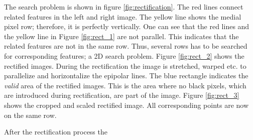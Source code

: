 \documentclass[11pt]{article}
\begin{document}
The search problem is shown in figure \ref{fig:rectification}. The red lines connect related features in the left and right image. The yellow line shows the medial pixel row; therefore, it is perfectly vertically. One can see that the red lines and the yellow line in Figure \ref{fig:rect_1} are not parallel. This indicates that the related features are not in the same row. Thus, several rows has to be searched for corresponding features; a 2D search problem. Figure \ref{fig:rect_2} shows the rectified images. During the rectification the image is stretched, warped etc. to parallelize and horizontalize the epipolar lines. The blue rectangle indicates the \emph{valid} area of the rectified images. This is the area where no black pixels, which are introduced during rectification, are part of the image. Figure \ref{fig:rect_3} shows the cropped and scaled rectified image. All corresponding points are now on the same row.

After the rectification process the 
\end{document}
